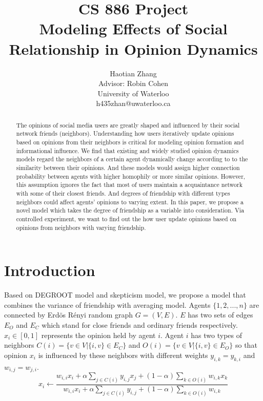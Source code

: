 \documentclass[11pt]{article}
\title{CS 886 Project\\Modeling Effects of Social Relationship in Opinion Dynamics}
\author{Haotian Zhang\\Advisor: Robin Cohen\\University of Waterloo\\h435zhan@uwaterloo.ca}
\date{}
\theoremstyle{definition}
\theoremstyle{basic}
\begin{document}
\maketitle

\begin{abstract}
The opinions of social media users are greatly shaped and influenced
by their social network friends (neighbors). Understanding how users
iteratively update opinions based on opinions from their neighbors 
is critical for modeling opinion formation and informational influence.
We find that existing and widely studied opinion dynamics models
regard the neighbors of a certain agent dynamically change according to
to the similarity between their opinions. And these models would
assign higher connection probability between agents with higher homophily
or more similar opinions.
However, this assumption
ignores the fact that most of users maintain a acquaintance
network with some of their closest friends. And degrees of friendship with
different types neighbors could affect agents' opinions to varying extent. In this
paper, we propose a novel model which takes the degree of friendship as 
a variable into consideration. Via controlled experiment,
we want to find out the how user update opinions based on opinions from
neighbors with varying friendship.

\end{abstract}


\section{Introduction}
Based on DEGROOT model and skepticism model, we propose a model that combines the variance of friendship with averaging model. Agents $\{1,2,...,n\}$ are connected by Erd\"{o}s R\'{e}nyi random graph $G=(V,E)$. $E$ has two sets of edges $E_O$ and $E_C$ which stand for close friends and ordinary friends respectively. $x_i \in [0,1]$ represents the opinion held by agent $i$. Agent $i$ has two types of neighbors $C(i)=\{v \in V|\{i,v\}\in E_C\}$ and $O(i)=\{v \in V|\{i,v\}\in E_O\}$ so that opinion $x_i$ is influenced by these neighbors with different weights $y_{i,k}=y_{k,i}$ and $w_{i,j}=w_{j,i}$.  
\begin{equation}
x_i \gets \frac{w_{i,i}x_i + \alpha\sum\limits_{j \in C(i)}y_{i,j}x_j + (1-\alpha)\sum\limits_{k \in O(i)}w_{i,k}x_k}{w_{i,i}x_i + \alpha\sum\limits_{j \in C(i)}y_{i,j} + (1-\alpha)\sum\limits_{k \in O(i)}w_{i,k}}
\end{equation} 
\end{document}
